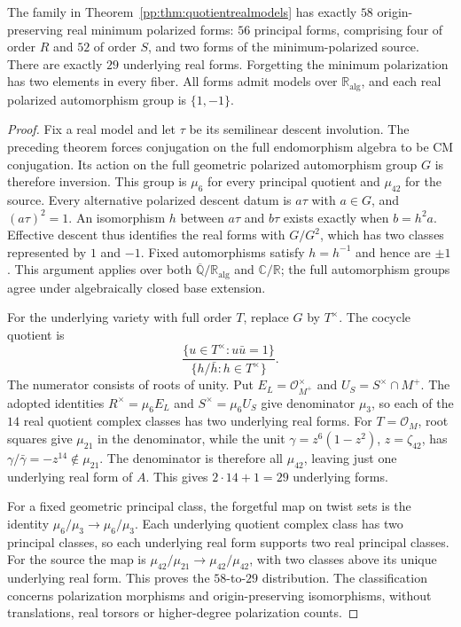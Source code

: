 \begin{corollary}
\label{pp:cor:quotientrealforms}
The family in Theorem~\ref{pp:thm:quotientrealmodels} has exactly
$58$ origin-preserving real minimum polarized forms: $56$ principal
forms, comprising four of order $R$ and $52$ of order $S$, and two
forms of the minimum-polarized source. There are exactly $29$ underlying
real forms. Forgetting the minimum polarization has two elements in
every fiber. All forms admit models over $\mathbb R_{\mathrm{alg}}$,
and each real polarized automorphism group is $\{1,-1\}$.
\end{corollary}
\begin{proof}
Fix a real model and let $\tau$ be its semilinear descent involution.
The preceding theorem forces conjugation on the full endomorphism
algebra to be CM conjugation. Its action on the full geometric polarized
automorphism group $G$ is therefore inversion. This group is $\mu_6$
for every principal quotient and $\mu_{42}$ for the source.
Every alternative polarized descent datum is $a\tau$ with $a\in G$,
and $(a\tau)^2=1$. An isomorphism $h$ between $a\tau$ and $b\tau$
exists exactly when $b=h^2a$. Effective descent thus identifies the
real forms with $G/G^2$, which has two classes represented by $1$ and
$-1$. Fixed automorphisms satisfy $h=h^{-1}$ and hence are $\pm1$.
This argument applies over both $\overline{\mathbb Q}/\mathbb R_{\mathrm{alg}}$
and $\mathbb C/\mathbb R$; the full automorphism groups agree under
algebraically closed base extension.

For the underlying variety with full order $T$, replace $G$ by
$T^\times$. The cocycle quotient is
\[
 \frac{\{u\in T^\times:u\bar u=1\}}
 {\{h/\bar h:h\in T^\times\}}.
\]
The numerator consists of roots of unity. Put $E_L=\mathcal O_{M^+}^{\times}$ and
$U_S=S^\times\cap M^+$. The adopted identities
$R^\times=\mu_6E_L$ and $S^\times=\mu_6U_S$ give denominator
$\mu_3$, so each of the $14$ real quotient complex classes has two
underlying real forms. For $T=\mathcal O_M$, root squares give
$\mu_{21}$ in the denominator, while the unit
$\gamma=z^6(1-z^2)$, $z=\zeta_{42}$, has
$\gamma/\bar\gamma=-z^{14}\notin\mu_{21}$. The denominator is
therefore all $\mu_{42}$, leaving just one underlying real form of $A$.
This gives $2\cdot14+1=29$ underlying forms.

For a fixed geometric principal class, the forgetful map on twist sets
is the identity $\mu_6/\mu_3\longrightarrow\mu_6/\mu_3$.
Each underlying quotient complex class has two principal classes,
so each underlying real form supports two real principal classes.
For the source the map is
$\mu_{42}/\mu_{21}\longrightarrow\mu_{42}/\mu_{42}$, with two
classes above its unique underlying real form. This proves the
$58$-to-$29$ distribution. The classification concerns polarization
morphisms and origin-preserving isomorphisms, without translations,
real torsors or higher-degree polarization counts.
\end{proof}

